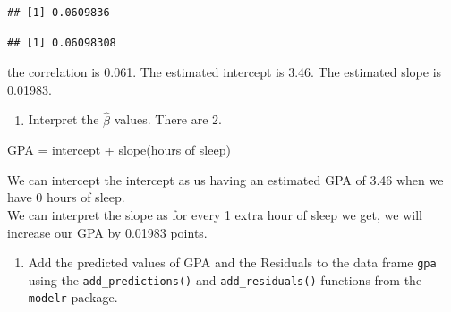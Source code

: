 \documentclass[]{article}
\newenvironment{Shaded}{\begin{snugshade}}{\end{snugshade}}
\newcommand{\KeywordTok}[1]{\textcolor[rgb]{0.13,0.29,0.53}{\textbf{#1}}}
\newcommand{\NormalTok}[1]{#1}
\newcommand{\OperatorTok}[1]{\textcolor[rgb]{0.81,0.36,0.00}{\textbf{#1}}}
\newcommand{\StringTok}[1]{\textcolor[rgb]{0.31,0.60,0.02}{#1}}
\providecommand{\tightlist}{%
  \setlength{\itemsep}{0pt}\setlength{\parskip}{0pt}}
\begin{document}
\begin{verbatim}
## [1] 0.0609836
\end{verbatim}

\begin{Shaded}
\end{Shaded}

\begin{verbatim}
## [1] 0.06098308
\end{verbatim}

the correlation is 0.061. The estimated intercept is 3.46. The estimated
slope is 0.01983.

\begin{enumerate}
\def\labelenumi{\arabic{enumi}.}
\setcounter{enumi}{4}
\tightlist
\item
  Interpret the \(\hat{\beta}\) values. There are 2.
\end{enumerate}

GPA = intercept + slope(hours of sleep)

We can intercept the intercept as us having an estimated GPA of 3.46
when we have 0 hours of sleep.\\
We can interpret the slope as for every 1 extra hour of sleep we get, we
will increase our GPA by 0.01983 points.

\newpage

\begin{enumerate}
\def\labelenumi{\arabic{enumi}.}
\setcounter{enumi}{5}
\tightlist
\item
  Add the predicted values of GPA and the Residuals to the data frame
  \texttt{gpa} using the \texttt{add\_predictions()} and
  \texttt{add\_residuals()} functions from the \texttt{modelr} package.
\end{enumerate}

\begin{Shaded}
\end{Shaded}

\begin{Shaded}
\end{Shaded}
\end{document}
